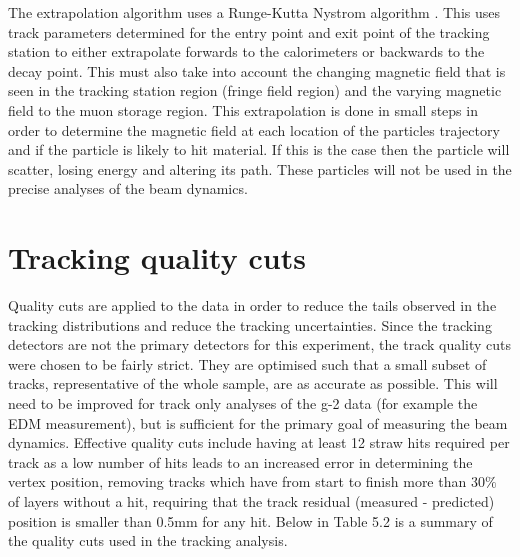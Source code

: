 The extrapolation algorithm uses a Runge-Kutta Nystrom algorithm \cite{rungekutta1}\cite{rungekutta2}. 
This uses track parameters determined for the entry point and exit point of the tracking station to either extrapolate forwards to the calorimeters or backwards to the decay point. This must also take into account the changing magnetic field that is seen in the tracking station region (fringe field region) and the varying magnetic field to the muon storage region. This extrapolation is done in small steps in order to determine the magnetic field at each location of the particles trajectory and if the particle is likely to hit material. If this is the case then the particle will scatter, losing energy and altering its path. These particles will not be used in the precise analyses of the beam dynamics.

\section{Tracking quality cuts}

Quality cuts are applied to the data in order to reduce the tails observed in the tracking distributions and reduce the tracking uncertainties. Since the tracking detectors are not the primary detectors for this experiment, the track quality cuts were chosen to be fairly strict. They are optimised such that a small subset of tracks, representative of the whole sample, are as accurate as possible. This will need to be improved for track only analyses of the g-2 data (for example the EDM measurement), but is sufficient for the primary goal of measuring the beam dynamics. Effective quality cuts include having at least 12 straw hits required per track as a low number of hits leads to an increased error in determining the vertex position, removing tracks which have from start to finish more than 30$\%$ of layers without a hit, requiring that the track residual (measured - predicted) position is smaller than 0.5mm for any hit. Below in Table 5.2 is a summary of the quality cuts used in the tracking analysis.


